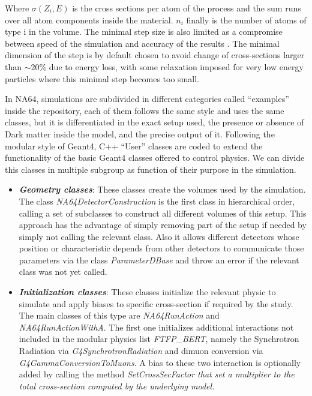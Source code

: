 Where $\sigma(Z_i,E)$ is the cross sections per atom of the process and the sum runs over all atom components inside the material. $n_i$ finally is the number of atoms of type i in the volume. The minimal step size is also limited as a compromise between speed of the simulation and accuracy of the results \cite{geant4-phys-guide}. The minimal dimension of the step is by default chosen to avoid change of cross-sections larger than $\sim$20\% due to energy loss, with some relaxation imposed for very low energy particles where this minimal step becomes too small.

In NA64, simulations are subdivided in different categories called ``examples'' inside the repository, each of them follows the same style and uses the same classes, but it is differentiated in the exact setup used, the presence or absence of Dark matter inside the model, and the precise output of it. Following the modular style of Geant4, C++ ``User'' classes are coded to extend the functionality of the basic Geant4 classes offered to control physics. We can divide this classes in multiple subgroup as function of their purpose in the simulation.

\begin{itemize}
\item \textbf{\textit{Geometry classes}}: These classes create the volumes used by the simulation. The class \textit{NA64DetectorConstruction} is the first class in hierarchical order, calling a set of subclasses to construct all different volumes of this setup. This approach has the advantage of simply removing part of the setup if needed by simply not calling the relevant class. Also it allows different detectors whose position or characteristic depends from other detectors to communicate those parameters via the class \textit{ParameterDBase} and throw an error if the relevant class was not yet called.
\item \textbf{\textit{Initialization classes}}: These classes initialize the relevant physic to simulate and apply biases to specific cross-section if required by the study. The main classes of this type are \textit{NA64RunAction} and \textit{NA64RunActionWithA}. The first one initializes additional interactions not included in the modular physics list \textit{FTFP\_BERT}, namely the Synchrotron Radiation via \textit{G4SynchrotronRadiation} and dimuon conversion via \textit{G4GammaConversionToMuons}. A bias to these two interaction is optionally added by calling the method \it{SetCrossSecFactor} that set a multiplier to the total cross-section computed by the underlying model.
\end{itemize}


